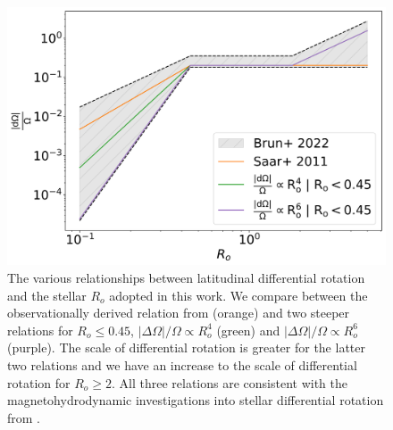 \begin{figure}
\centering
  \includegraphics[width=\textwidth]{Figures/rot_gap_figures/comparison_diffrot.png}
  \caption{
  	The various relationships between latitudinal differential rotation and the stellar $R_o$ adopted in this work. We compare between the observationally derived relation from \citet{saar_starspots_2011} (orange) and two steeper relations for $R_o\leq0.45$, $|\Delta \Omega|/\Omega \propto R_o^4$ (green) and $|\Delta \Omega|/\Omega \propto R_o^6$ (purple). The scale of differential rotation is greater for the latter two relations and we have an increase to the scale of differential rotation for $R_o\geq2$. All three relations are consistent with the magnetohydrodynamic investigations into stellar differential rotation from \citet{brun_powering_2022}.
}
  \label{fig:compar_diffrot}
\end{figure}

